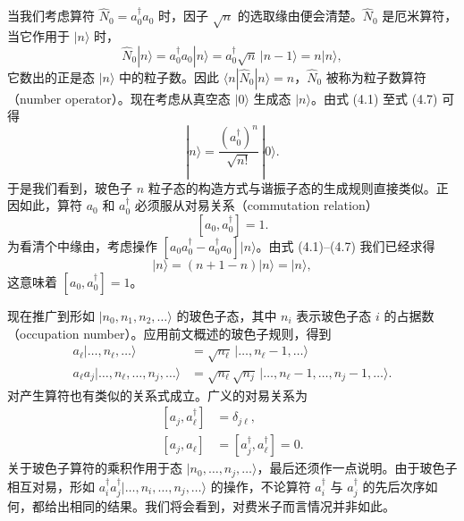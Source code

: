 当我们考虑算符 $\widehat{N}_0=a_0^\dagger a_0$ 时，因子 $\sqrt{n}$ 的选取缘由便会清楚。$\widehat{N}_0$ 是厄米算符，当它作用于 $|n\rangle$ 时，
\begin{equation*}
\widehat{N}_0|n\rangle=a_0^\dagger a_0|n\rangle=a_0^\dagger\sqrt{n}\,|n-1\rangle=n|n\rangle,
\tag{4.7}
\end{equation*}
它数出的正是态 $|n\rangle$ 中的粒子数。因此 $\langle n|\widehat{N}_0|n\rangle=n$，$\widehat{N}_0$ 被称为粒子数算符（number operator）。现在考虑从真空态 $|0\rangle$ 生成态 $|n\rangle$。由式 (4.1) 至式 (4.7) 可得
\begin{equation*}
|n\rangle=\frac{(a_0^\dagger)^n}{\sqrt{n!}}\,|0\rangle.
\tag{4.8}
\end{equation*}
于是我们看到，玻色子 $n$ 粒子态的构造方式与谐振子态的生成规则直接类似。正因如此，算符 $a_0$ 和 $a_0^\dagger$ 必须服从对易关系（commutation relation）
\begin{equation*}
\left[a_0,a_0^\dagger\right]=1.
\tag{4.9}
\end{equation*}
为看清个中缘由，考虑操作 $[a_0a_0^\dagger-a_0^\dagger a_0]|n\rangle$。由式 (4.1)–(4.7) 我们已经求得
\begin{equation*}
[a_0a_0^\dagger-a_0^\dagger a_0]|n\rangle=(n+1-n)|n\rangle=|n\rangle,
\tag{4.10}
\end{equation*}
这意味着 $[a_0,a_0^\dagger]=1$。

现在推广到形如 $|n_0,n_1,n_2,\ldots\rangle$ 的玻色子态，其中 $n_i$ 表示玻色子态 $i$ 的占据数（occupation number）。应用前文概述的玻色子规则，得到
\begin{align*}
a_\ell|\ldots,n_\ell,\ldots\rangle &= \sqrt{n_\ell}\,|\ldots,n_\ell-1,\ldots\rangle \\
a_\ell a_j|\ldots,n_\ell,\ldots,n_j,\ldots\rangle &= \sqrt{n_\ell}\sqrt{n_j}\,|\ldots,n_\ell-1,\ldots,n_j-1,\ldots\rangle.
\tag{4.11}
\end{align*}
对产生算符也有类似的关系式成立。广义的对易关系为
\begin{align*}
\left[a_j,a_\ell^\dagger\right] &= \delta_{j\ell}, \\
\left[a_j,a_\ell\right] &= \left[a_j^\dagger,a_\ell^\dagger\right]=0.
\tag{4.12}
\end{align*}
关于玻色子算符的乘积作用于态 $|n_0,\ldots,n_j,\ldots\rangle$，最后还须作一点说明。由于玻色子相互对易，形如 $a_i^\dagger a_j^\dagger|\ldots,n_i,\ldots,n_j,\ldots\rangle$ 的操作，不论算符 $a_i^\dagger$ 与 $a_j^\dagger$ 的先后次序如何，都给出相同的结果。我们将会看到，对费米子而言情况并非如此。

